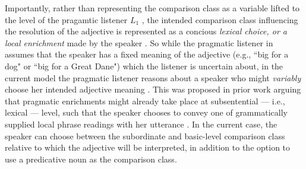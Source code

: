 Importantly, rather than representing the comparison class as a variable lifted to the level of the pragamtic listener $L_1$ \parencite[as proposed by][]{tessler2017warm}, the intended comparison class influencing the resolution of the adjective is represented as a concious \emph{lexical choice, or a local enrichment} made by the speaker \parencite[e.g., discussed for other phenomena by][]{chierchia2012grammatical, problang}. So while the pragmatic listener in \textcite{tessler2017warm} assumes that the speaker has a fixed meaning of the adjective (e.g., ``big for a dog" or ``big for a Great Dane") which the listener is uncertain about, in the current model the pragmatic listener reasons about a speaker who might \emph{variably} choose her intended adjective meaning \parencite[cf.][]{problang}. 
This was proposed in prior work arguing that pragmatic enrichments might already take place at subsentential --- i.e., lexical --- level, such that the speaker chooses to convey one of grammatically supplied local phrase readings with her utterance \parencite[for instance, applied to scalar implicatures by][]{chierchia2012grammatical}. In the current case, the speaker can choose between the subordinate and basic-level comparison class relative to which the adjective will be interpreted, in addition to the option to use a predicative noun as the comparison class. 

